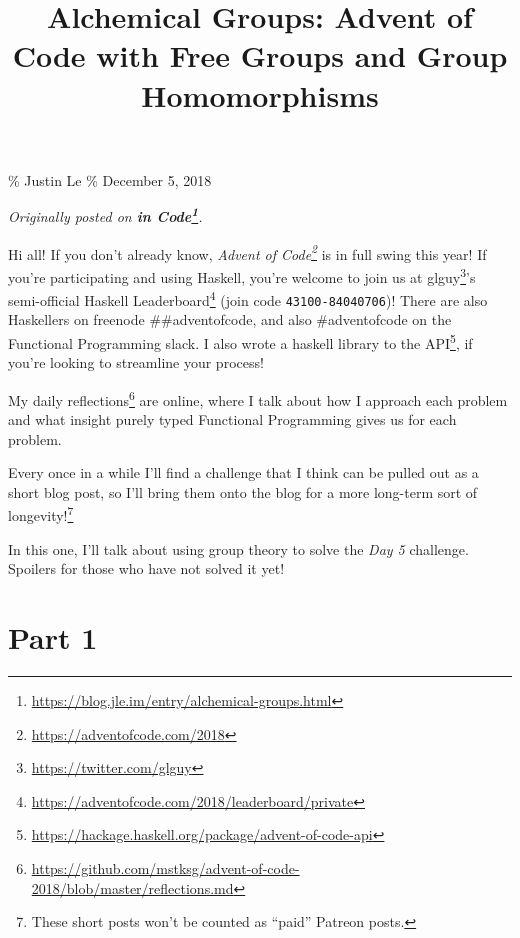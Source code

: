 \documentclass[]{article}
\title{Alchemical Groups: Advent of Code with Free Groups and Group
Homomorphisms}
\renewcommand{\href}[2]{#2\footnote{\url{#1}}}
\begin{document}
\maketitle

\% Justin Le \% December 5, 2018

\emph{Originally posted on
\textbf{\href{https://blog.jle.im/entry/alchemical-groups.html}{in Code}}.}

Hi all! If you don't already know,
\emph{\href{https://adventofcode.com/2018}{Advent of Code}} is in full swing
this year! If you're participating and using Haskell, you're welcome to join us
at \href{https://twitter.com/glguy}{glguy}'s semi-official
\href{https://adventofcode.com/2018/leaderboard/private}{Haskell Leaderboard}
(join code \texttt{43100-84040706})! There are also Haskellers on freenode
\#\#adventofcode, and also \#adventofcode on the Functional Programming slack. I
also wrote a
\href{https://hackage.haskell.org/package/advent-of-code-api}{haskell library to
the API}, if you're looking to streamline your process!

My
\href{https://github.com/mstksg/advent-of-code-2018/blob/master/reflections.md}{daily
reflections} are online, where I talk about how I approach each problem and what
insight purely typed Functional Programming gives us for each problem.

Every once in a while I'll find a challenge that I think can be pulled out as a
short blog post, so I'll bring them onto the blog for a more long-term sort of
longevity!\footnote{These short posts won't be counted as ``paid'' Patreon
  posts.}

In this one, I'll talk about using group theory to solve the \emph{Day 5}
challenge. Spoilers for those who have not solved it yet!

\section{Part 1}\label{part-1}
\end{document}
